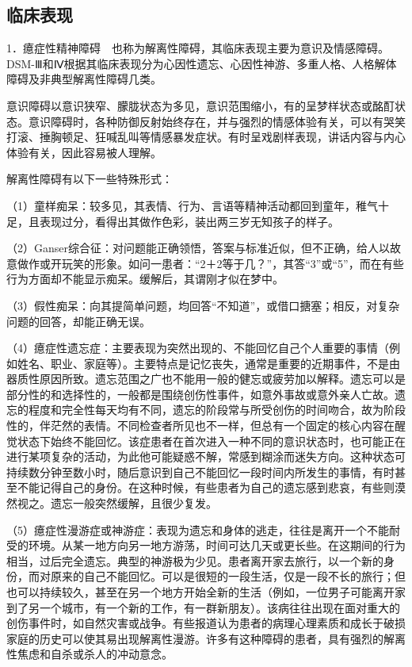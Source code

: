 \subsection{临床表现}

1．癔症性精神障碍　也称为解离性障碍，其临床表现主要为意识及情感障碍。DSM-Ⅲ和Ⅳ根据其临床表现分为心因性遗忘、心因性神游、多重人格、人格解体障碍及非典型解离性障碍几类。

意识障碍以意识狭窄、朦胧状态为多见，意识范围缩小，有的呈梦样状态或酩酊状态。意识障碍时，各种防御反射始终存在，并与强烈的情感体验有关，可以有哭笑打滚、捶胸顿足、狂喊乱叫等情感暴发症状。有时呈戏剧样表现，讲话内容与内心体验有关，因此容易被人理解。

解离性障碍有以下一些特殊形式：

（1）童样痴呆：较多见，其表情、行为、言语等精神活动都回到童年，稚气十足，且表现过分，看得出其做作色彩，装出两三岁无知孩子的样子。

（2）Ganser综合征：对问题能正确领悟，答案与标准近似，但不正确，给人以故意做作或开玩笑的形象。如问一患者：“2＋2等于几？”，其答“3”或“5”，而在有些行为方面却不能显示痴呆。缓解后，其谓刚才似在梦中。

（3）假性痴呆：向其提简单问题，均回答“不知道”，或借口搪塞；相反，对复杂问题的回答，却能正确无误。

（4）癔症性遗忘症：主要表现为突然出现的、不能回忆自己个人重要的事情（例如姓名、职业、家庭等）。主要特点是记忆丧失，通常是重要的近期事件，不是由器质性原因所致。遗忘范围之广也不能用一般的健忘或疲劳加以解释。遗忘可以是部分性的和选择性的，一般都是围绕创伤性事件，如意外事故或意外亲人亡故。遗忘的程度和完全性每天均有不同，遗忘的阶段常与所受创伤的时间吻合，故为阶段性的，伴茫然的表情。不同检查者所见也不一样，但总有一个固定的核心内容在醒觉状态下始终不能回忆。该症患者在首次进入一种不同的意识状态时，也可能正在进行某项复杂的活动，为此他可能疑惑不解，常感到糊涂而迷失方向。这种状态可持续数分钟至数小时，随后意识到自己不能回忆一段时间内所发生的事情，有时甚至不能记得自己的身份。在这种时候，有些患者为自己的遗忘感到悲哀，有些则漠然视之。遗忘一般突然缓解，且很少复发。

（5）癔症性漫游症或神游症：表现为遗忘和身体的逃走，往往是离开一个不能耐受的环境。从某一地方向另一地方游荡，时间可达几天或更长些。在这期间的行为相当，过后完全遗忘。典型的神游极为少见。患者离开家去旅行，以一个新的身份，而对原来的自己不能回忆。可以是很短的一段生活，仅是一段不长的旅行；但也可以持续较久，甚至在另一个地方开始全新的生活（例如，一位男子可能离开家到了另一个城市，有一个新的工作，有一群新朋友）。该病往往出现在面对重大的创伤事件时，如自然灾害或战争。有些报道认为患者的病理心理素质和成长于破损家庭的历史可以使其易出现解离性漫游。许多有这种障碍的患者，具有强烈的解离性焦虑和自杀或杀人的冲动意念。

